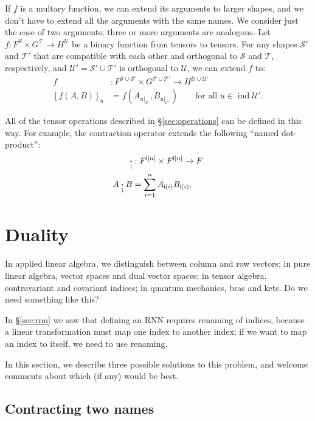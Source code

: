 \documentclass{article}
\DeclareMathOperator{\tupleshape}{ind}
\newcommand{\tuplerestrict}[2]{\left.#1\right|_{#2}}
\begin{document}
If $f$ is a multary function, we can extend its arguments to larger shapes, and we don't have to extend all the arguments with the same names. We consider just the case of two arguments; three or more arguments are analogous. Let $f \colon F^{\mathcal{S}} \times G^{\mathcal{T}} \rightarrow H^{\mathcal{U}}$ be a binary function from tensors to tensors. For any shapes $\mathcal{S'}$ and $\mathcal{T'}$ that are compatible with each other and orthogonal to $\mathcal{S}$ and $\mathcal{T}$, respectively, and $\mathcal{U'} = \mathcal{S'} \cup \mathcal{T'}$ is orthogonal to $\mathcal{U}$, we can extend $f$ to:
\begin{align*}
f &: F^{\mathcal{S} \cup \mathcal{S'}} \times G^{\mathcal{T} \cup \mathcal{T'}} \rightarrow H^{\mathcal{U} \cup \mathcal{U'}} \\
  [f(A,B)]_u &= f\left(A_{\tuplerestrict{u}{\mathcal{S'}}},B_{\tuplerestrict{u}{\mathcal{T'}}}\right) \qquad \text{for all $u \in \tupleshape\mathcal{U'}$.}
\end{align*}

All of the tensor operations described in \S\ref{sec:operations} can be defined in this way. For example, the contraction operator extends the following ``named dot-product'':
\begin{align*}
\mathbin{\mathop{\boldsymbol\cdot}\limits_{\mathsf{i}}} &: F^{\mathsf{i}[n]} \times F^{\mathsf{i}[n]} \rightarrow F \\
A \mathbin{\mathop{\boldsymbol\cdot}\limits_{\mathsf{i}}} B &= \sum_{i=1}^n A_{\mathsf{i}(i)} B_{\mathsf{i}(i)}.
\end{align*}

\section{Duality}
\label{sec:duality}

In applied linear algebra, we distinguish between column and row vectors; in pure linear algebra, vector spaces and dual vector spaces; in tensor algebra, contravariant and covariant indices; in quantum mechanics, bras and kets. Do we need something like this?

In \S\ref{sec:rnn} we saw that defining an RNN requires renaming of indices, because a linear transformation must map one index to another index; if we want to map an index to itself, we need to use renaming.

In this section, we describe three possible solutions to this problem, and welcome comments about which (if any) would be best.

\subsection{Contracting two names}
\end{document}

